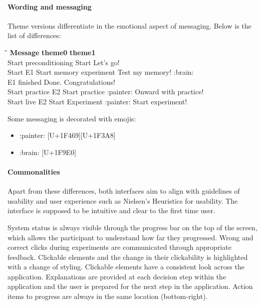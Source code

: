 	\paragraph{Wording and messaging}
	
	Theme versions differentiate in the emotional aspect of messaging. Below is the list of differences:

\begin{tabbing}
	\hspace{0cm}\=\hspace{5cm}\=\hspace{5cm}\=\kill
	\> \textbf{Message} 					\> \textbf{theme0} 	\> \textbf{theme1} \\ 
	\> Start preconditioning 	\> Start 	\> Let's go! \\ 
	\> Start E1 	\> Start memory experiment 	\> Test my memory! :brain: \\  
	\> E1 finished 	\> Done. 	\> Congratulations! \\ 
	\> Start practice E2 	\> Start practice 	\> :painter: Onward with practice! \\ 
	\> Start live E2 	\> Start Experiment 	\> :painter: Start experiment! \\ 

\end{tabbing} 
	
	Some messaging is decorated with emojis:
	
	\begin{itemize}
		\item :painter: [U+1F469][U+1F3A8]
		\item :brain: [U+1F9E0]
	\end{itemize}
	
	\paragraph{Commonalities}
	
	Apart from these differences, both interfaces aim to align with guidelines of usability and user experience such as Nielsen's Heuristics for usability. 
	The interface is supposed to be intuitive and clear to the first time user.
	
	System status is always visible through the progress bar on the top of the screen, which allows the participant to understand how far they progressed. Wrong and correct clicks during experiments are communicated through appropriate feedback. Clickable elements and the change in their clickability is highlighted with a change of styling. Clickable elements have a consistent look across the application. Explanations are provided at each decision step within the application and the user is prepared for the next step in the application. Action items to progress are always in the same location (bottom-right).
	
